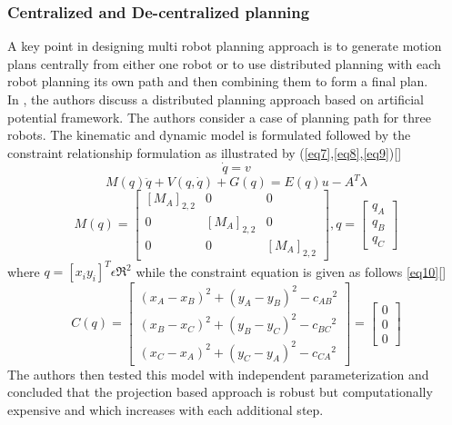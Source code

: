 \subsubsection{Centralized and De-centralized planning}
A key point in designing multi robot planning approach is to generate motion plans centrally from either one robot or to use distributed planning with each robot planning its own path and then combining them to form a final plan. \\
In \citet{LengFengLee}, the authors discuss a distributed planning approach based on artificial potential framework. The authors consider a case of planning path for three robots. The kinematic and dynamic model is formulated followed by the constraint relationship formulation as illustrated by (\eqref{eq7},\eqref{eq8},\eqref{eq9})[\citet{LengFengLee}]
\begin{equation}
\label{eq7}
\dot{q} = v
\end{equation}
\begin{equation}
\label{eq8}
M(q)\ddot{q} + V(q,\dot{q}) + G(q) = E(q)u - A^{T}\lambda
\end{equation}
\begin{equation}
\label{eq9}
M(q) = \begin{bmatrix} [M_{A}]_{2,2} & 0 & 0\\ 0 & [M_{A}]_{2,2}& 0\\ 0 & 0 & [M_{A}]_{2,2} \end{bmatrix},q = \begin{bmatrix} q_{A}\\ q_{B}\\ q_{C} \end{bmatrix}
\end{equation}
where $q=[x_{i} y_{i}]^{T} \epsilon \Re^{2}$
while the constraint equation is given as follows \eqref{eq10}[\citet{LengFengLee}]
\begin{equation}
\label{eq10}
C(q) = \begin{bmatrix} (x_{A} - x_{B})^{2} + (y_{A} - y_{B})^{2} - {c_{AB}}^2\\ (x_{B} - x_{C})^{2} + (y_{B} - y_{C})^{2} - {c_{BC}}^2\\ (x_{C} - x_{A})^{2} + (y_{C} - y_{A})^{2} - {c_{CA}}^2 \end{bmatrix} = \begin{bmatrix} 0\\ 0\\ 0 \end{bmatrix}
\end{equation}
The authors then tested this model with independent parameterization and concluded that the projection based approach is robust but computationally expensive and which increases with each additional step. 


